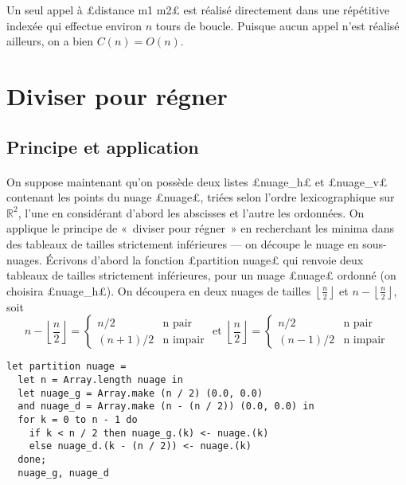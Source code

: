 \documentclass{article}
\renewcommand{\O}[1]{O\!\left(#1\right)}
\newcommand{\ent}[1]{\left\lfloor #1\right\rfloor}
\begin{document}
  Un seul appel à £distance m1 m2£ est réalisé directement dans une répétitive indexée qui effectue environ $n$ tours de boucle. Puisque aucun appel n'est réalisé ailleurs, on a bien $C(n) = \O{n}$.

  \section{Diviser pour régner}

  \subsection{Principe et application}

  \paragraph{} On suppose maintenant qu'on possède deux listes £nuage_h£ et £nuage_v£ contenant les points du nuage £nuage£, triées selon l'ordre lexicographique sur $\mathbb{R}^2$, l'une en considérant d'abord les abscisses et l'autre les ordonnées. On applique le principe de «~diviser pour régner~» en recherchant les minima dans des tableaux de tailles strictement inférieures --- on découpe le nuage en sous-nuages. Écrivons d'abord la fonction £partition nuage£ qui renvoie deux tableaux de tailles strictement inférieures, pour un nuage £nuage£ ordonné (on choisira £nuage_h£). On découpera en deux nuages de tailles $\ent{\frac{n}{2}}$ et $n - \ent{\frac{n}{2}}$, soit
  \begin{displaymath}
    n - \ent{\frac{n}{2}} =
    \left\{\begin{array}{rl}
      n/2 &\text{n pair} \\
      (n + 1)/2 &\text{n impair}
    \end{array}\right. \text{ et }
    \ent{\frac{n}{2}} =
    \left\{\begin{array}{rl}
      n/2 &\text{n pair} \\
      (n - 1)/2 &\text{n impair}
    \end{array}\right.
  \end{displaymath}

  \begin{lstlisting}
let partition nuage =
  let n = Array.length nuage in
  let nuage_g = Array.make (n / 2) (0.0, 0.0)
  and nuage_d = Array.make (n - (n / 2)) (0.0, 0.0) in
  for k = 0 to n - 1 do
    if k < n / 2 then nuage_g.(k) <- nuage.(k)
    else nuage_d.(k - (n / 2)) <- nuage.(k)
  done;
  nuage_g, nuage_d
  \end{lstlisting}
\end{document}
